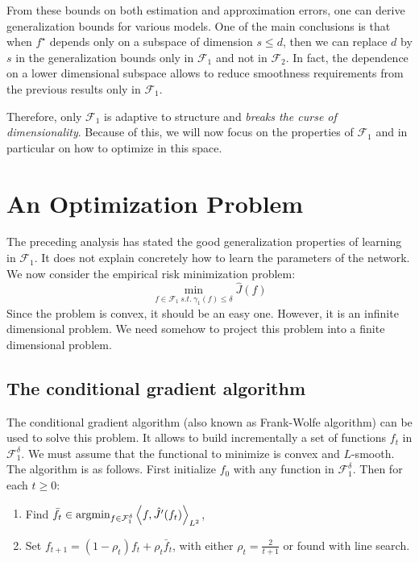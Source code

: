 \documentclass[a4paper, 11pt]{scrartcl}
\begin{document}
{From these bounds on both estimation and approximation errors, one can derive generalization bounds for various models. One of the main conclusions is that when $f^\star$ depends only on a subspace of dimension $s \leq d$, then we can replace $d$ by $s$ in the generalization bounds only in $\mathcal{F}_1$ and not in $\mathcal{F}_2$. In fact, the dependence on a lower dimensional subspace allows to reduce smoothness requirements from the previous results only in $\mathcal{F}_1$.

 Therefore, only $\mathcal{F}_1$ is adaptive to structure and \textit{breaks the curse of dimensionality}. Because of this, we will now focus on the properties of $\mathcal{F}_1$ and in particular on how to optimize in this space.

\section{An Optimization Problem}

The preceding analysis has stated the good generalization properties of learning in $\mathcal{F}_1$. It does not explain concretely how to learn the parameters of the network. We now consider the empirical risk minimization problem:
\begin{equation}
\min_{f\in \mathcal{F}_1~ s.t. ~ \gamma_{1} (f) \leq \delta}  \hat J(f)
\end{equation}
 Since the problem is convex, it should be an easy one. However, it is an infinite dimensional problem. We need somehow to project this problem into a finite dimensional problem.
 
 
\subsection{The conditional gradient algorithm}
 
The conditional gradient algorithm (also known as Frank-Wolfe algorithm) can be used to solve this problem. It allows to build incrementally a set of functions $f_t$ in $\mathcal{F}_1^\delta$. We must assume that the functional to minimize is convex and $L$-smooth.\\

The algorithm is as follows. First initialize $f_0$ with any function in  $\mathcal{F}_1^\delta$. Then for each $t\geq 0$:
\begin{enumerate}
\item Find $\bar f_t \in \textnormal{argmin}_{f \in \mathcal{F}_1^\delta} \left\langle f, \hat J^\prime (f_t) \right\rangle_{L^2}$,
\item Set $f_{t+1} = (1 - \rho_t) f_t + \rho_t \bar f_t$, with either $\rho_t = \frac{2}{t+1}$ or found with line search.
\end{enumerate}

}
\end{document}
